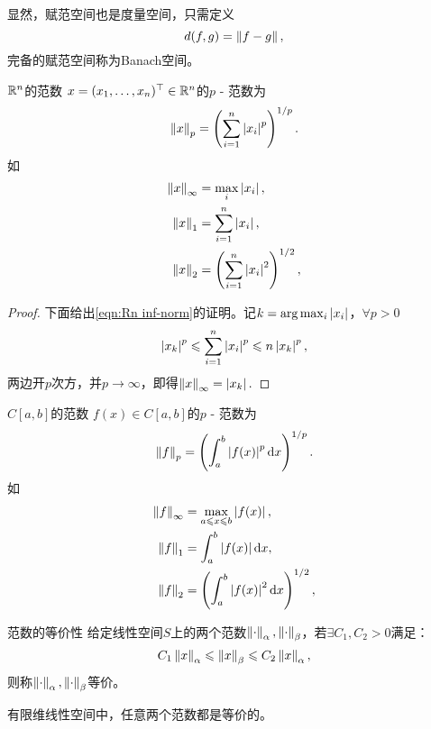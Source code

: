 显然，赋范空间也是度量空间，只需定义
\[
    d(f,g)=\left\lVert f-g\right\rVert,
\]
完备的赋范空间称为Banach空间。

\begin{example}
    {$\mathbb R^n$的范数}{}
    $x=(x_1,\ldots,x_n)^\top\in\mathbb R^n$的$p$ - 范数为
    \[
        \left\lVert x\right\rVert_p=\left(\sum_{i=1}^n\left\lvert x_i\right\rvert^p\right)^{1/p}.
    \]
    如
    \begin{subequations}
        \begin{align}
            \label{eqn:Rn inf-norm}
            \left\lVert x\right\rVert_\infty&=\max_{i}\left\lvert x_i\right\rvert,\\
            \label{eqn:Rn 1-norm}
            \left\lVert x\right\rVert_1&=\sum_{i=1}^n\left\lvert x_i\right\rvert,\\
            \label{eqn:Rn 2-norm}
            \left\lVert x\right\rVert_2&=\left(\sum_{i=1}^n\left\lvert x_i\right\rvert^2\right)^{1/2},
        \end{align}
    \end{subequations}
    \begin{proof}
        下面给出\eqref{eqn:Rn inf-norm}的证明。记$k=\arg\max_i\left\lvert x_i\right\rvert$，$\forall p>0$
        \[
            \left\lvert x_k\right\rvert^p\leqslant\sum_{i=1}^n\left\lvert x_i\right\rvert^p\leqslant n\left\lvert x_k\right\rvert^p,
        \]
        两边开$p$次方，并$p\to\infty$，即得$\left\lVert x\right\rVert_\infty=\left\lvert x_k\right\rvert.$
    \end{proof}
\end{example}

\begin{example}
    {$C[a,b]$的范数}{}
    $f(x)\in C[a,b]$的$p$ - 范数为
    \[
        \left\lVert f\right\rVert_p=\left(\int_a^b\left\lvert f(x)\right\rvert^p\mathop{}\!\mathrm{d} x\right)^{1/p}.
    \]
    如
    \begin{subequations}
        \begin{align}
            \left\lVert f\right\rVert_\infty&=\max_{a\leqslant x\leqslant b}\left\lvert f(x)\right\rvert,\\
            \left\lVert f\right\rVert_1&=\int_a^b\left\lvert f(x)\right\rvert\mathop{}\!\mathrm{d} x,\\
            \left\lVert f\right\rVert_2&=\left(\int_a^b\left\lvert f(x)\right\rvert^2\mathop{}\!\mathrm{d} x\right)^{1/2},
        \end{align}
    \end{subequations}
\end{example}

\begin{definition}
    {范数的等价性}{}
    给定线性空间$S$上的两个范数$\left\lVert\cdot\right\rVert_\alpha,\left\lVert\cdot\right\rVert_\beta$，若$\exists C_1,C_2>0$满足：
    \[
        C_1\left\lVert x\right\rVert_\alpha\leqslant\left\lVert x\right\rVert_\beta\leqslant C_2\left\lVert x\right\rVert_\alpha,
    \]
    则称$\left\lVert\cdot\right\rVert_\alpha,\left\lVert\cdot\right\rVert_\beta$等价。
\end{definition}

\begin{theorem}
    {}{}
    有限维线性空间中，任意两个范数都是等价的。
\end{theorem}


